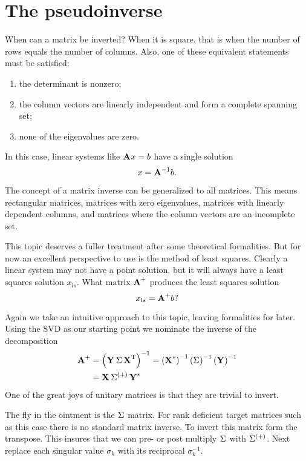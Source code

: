 \section{The pseudoinverse}

When can a matrix be inverted? When it is square, that is when the number of rows equals the number of columns. Also, one of these equivalent statements must be satisfied:
\begin{enumerate}
\item the determinant is nonzero;
\item the column vectors are linearly independent and form a complete spanning set;
\item none of the eigenvalues are zero.
\end{enumerate}
In this case, linear systems like $\textbf{A}^{\mathrm{}} x = b$ have a single solution
\begin{equation}
  x = \textbf{A}^{\mathrm{-1}}b.
\end{equation}

The concept of a matrix inverse can be generalized to all matrices. This means rectangular matrices, matrices with zero eigenvalues, matrices with linearly dependent columns, and matrices where the column vectors are an incomplete set.

This topic deserves a fuller treatment after some theoretical formalities. But for now an excellent perspective to use is the method of least squares. Clearly a linear system may not have a point solution, but it will always have a  least squares solution $x_{ls}$. What matrix $\textbf{A}^{\mathrm{+}}$ produces the least squares solution
\begin{equation}
  x_{ls}=\textbf{A}^{\mathrm{+}}b?
\end{equation}

Again we take an intuitive approach to this topic, leaving formalities for later. Using the SVD as our starting point we nominate the inverse of the decomposition 
\begin{equation}
  \begin{split}
    \textbf{A}^{\mathrm{+}}&=\left( \textbf{Y}^{\mathrm{}}\, \Sigma \, \textbf{X}^{\mathrm{ \mathrm{T} }} \right)^{-1}=\left( \textbf{X}^{\mathrm{*}} \right)^{-1}\left( \Sigma^{\mathrm{}} \right)^{-1}\left( \textbf{Y}^{\mathrm{}} \right)^{-1} \\
     &= \textbf{X}^{\mathrm{}} \, \Sigma^{\mathrm{(+)}} \, \textbf{Y}^{\mathrm{ \mathrm{*} }}
  \end{split}
\end{equation}
One of the great joys of unitary matrices is that they are trivial to invert.

The fly in the ointment is the $\Sigma^{\mathrm{}}$ matrix. For rank deficient target matrices such as this case there is no standard matrix inverse. To invert this matrix form the transpose. This insures that we can pre- or post multiply $\Sigma^{\mathrm{}}$ with $\Sigma^{\mathrm{(+)}}$. Next replace each singular value $\sigma_{k}$ with its reciprocal $\sigma_{k}^{-1}$.

